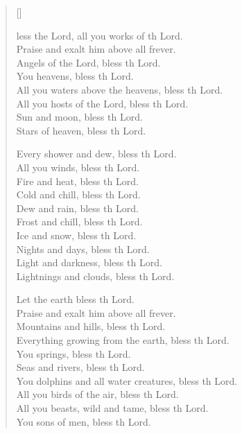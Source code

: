 \settowidth{\versewidth}{Let us bless the Father, and the Son, and the Holy Spirit. *}
\begin{verse}[\versewidth]
  \begin{patverse}
    less the Lord, all you works of th Lord.\Med\\
Praise and exalt him above all frever.\\
Angels of the Lord, bless th Lord.\Med\\
You heavens, bless th Lord.\\
All you waters above the heavens, bless th Lord.\Med\\
All you hosts of the Lord, bless th Lord.\\
Sun and moon, bless th Lord.\Med\\
Stars of heaven, bless th Lord.

Every shower and dew, bless th Lord.\Med\\
All you winds, bless th Lord.\\
Fire and heat, bless th Lord.\Med\\
Cold and chill, bless th Lord.\\
Dew and rain, bless th Lord.\Med\\
Frost and chill, bless th Lord.\\
Ice and snow, bless th Lord.\Med\\
Nights and days, bless th Lord.\\
Light and darkness, bless th Lord.\Med\\
Lightnings and clouds, bless th Lord.

Let the earth bless th Lord.\Med\\
Praise and exalt him above all frever.\\
Mountains and hills, bless th Lord.\Med\\
Everything growing from the earth, bless th Lord.\\
You springs, bless th Lord.\Med\\
Seas and rivers, bless th Lord.\\
You dolphins and all water creatures, bless th Lord.\Med\\
All you birds of the air, bless th Lord.\\
All you beasts, wild and tame, bless th Lord.\Med\\
You sons of men, bless th Lord.


\end{patverse}
\end{verse}

